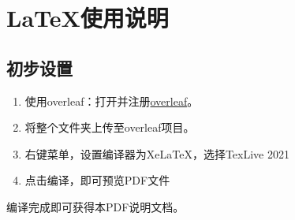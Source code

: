\chapter{LaTeX使用说明}\label{chap:guide}
\setcounter{page}{1}
\pagestyle{mainmatterstyle}

\section{初步设置}

\begin{enumerate}
    \item 使用overleaf：打开并注册\href{https://cn.overleaf.com/}{overleaf}。
    \item 将整个文件夹上传至overleaf项目。
    \item 右键菜单，设置编译器为XeLaTeX，选择TexLive 2021
    \item 点击编译，即可预览PDF文件
\end{enumerate}

编译完成即可获得本PDF说明文档。
